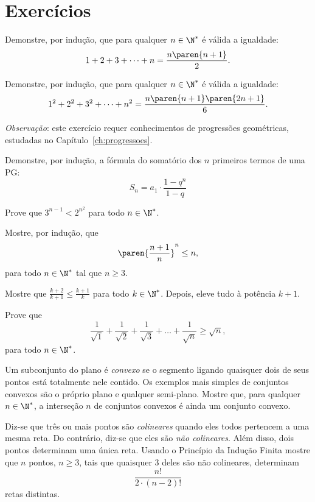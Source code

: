 \section{Exercícios}

\begin{exercise}
Demonstre, por indução, que para qualquer $n \in \N^*$ é válida a igualdade:
$$1+2+ 3+ \dots + n = \frac{n \paren {n+1}} 2.$$
\end{exercise}

\begin{exercise}
Demonstre, por indução, que para qualquer $n \in \N^*$ é
válida a igualdade:
$$1^2 +2^2 + 3^2+ \dots + n^2 = \frac{n \paren {n+1} \paren{2n+1}} 6.$$
\end{exercise}

\begin{exercise}
\textit{Observação}: este exercício requer conhecimentos de progressões geométricas,
estudadas no Capítulo~\ref{ch:progressoes}.

	Demonstre, por indução, a fórmula do somatório dos $n$ primeiros termos de uma PG:
	\[S_n = a_1 \cdot \frac{1-q^n}{1-q}\]
\end{exercise}

\begin{exercise}
Prove que $3^{n-1} < 2^{n^2}$ para todo $n \in \N^*$.
\end{exercise}

\begin{exercise}
Mostre, por indução, que
$$\paren{\frac {n+1}{n}}^n \leq n,$$
para todo $n \in \N^*$ tal que $n \geq 3$.

\begin{hint}
Mostre que $\frac{k+2}{k+1} \leq \frac{k+1} k$ para todo $k \in
\N^*$. Depois, eleve tudo à potência $k+1$.
\end{hint}
\end{exercise}

\begin{exercise}
Prove que
$$\frac 1 {\sqrt 1} +\frac 1 {\sqrt 2} +\frac 1 {\sqrt 3} + \dots + \frac 1 {\sqrt n} \geq \sqrt n,$$
para todo $ n \in \N^*$.
\end{exercise}

\begin{exercise}
Um subconjunto do plano é \emph{convexo} se o segmento ligando quaisquer dois de seus pontos está totalmente nele contido.
Os exemplos mais simples de conjuntos convexos são o próprio plano e qualquer semi-plano.
Mostre que, para qualquer $n \in \N^*$, a interseção $n$ de conjuntos convexos é ainda um conjunto convexo.
\end{exercise}

\begin{exercise}
Diz-se que três ou mais pontos são \emph{colineares} quando eles todos pertencem a uma mesma reta.
Do contrário, diz-se que eles são \emph{não colineares}.
Além disso, dois pontos determinam uma única reta.
Usando o Princípio da Indução Finita mostre que $n$ pontos, $n\geq 3$, tais que quaisquer 3 deles são não colineares, determinam
$$\frac{n!}{2\cdot(n-2)!}$$
retas distintas.
\end{exercise}